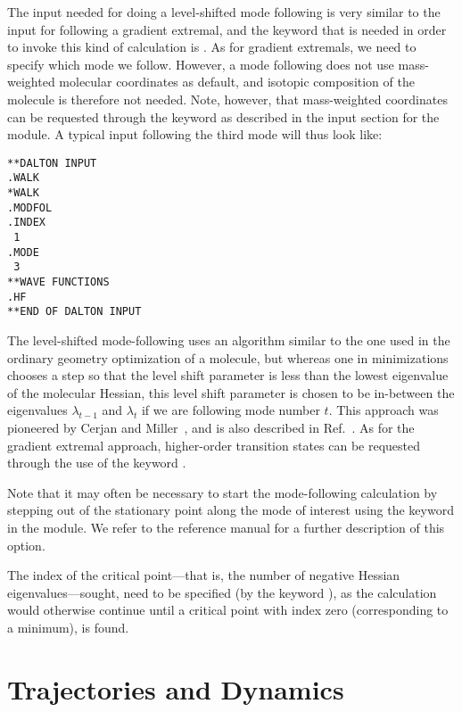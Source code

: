 The input needed for doing a level-shifted mode
following is very similar to the input for
following a gradient extremal, and the
keyword that is needed in order to invoke this kind of calculation is
. As for gradient extremals, we need to specify which
mode we follow. However, a mode following does not use mass-weighted
molecular coordinates as default, and
isotopic composition of the
molecule is therefore not needed. Note, however, that mass-weighted
coordinates can be requested through the keyword  as
described in the input section for the  module. A typical
input following the third mode will thus look like:

\begin{verbatim}
**DALTON INPUT
.WALK
*WALK
.MODFOL
.INDEX
 1
.MODE
 3
**WAVE FUNCTIONS
.HF
**END OF DALTON INPUT
\end{verbatim}

The level-shifted mode-following uses an algorithm similar to the
one used in the ordinary geometry optimization of a molecule, but
whereas one in minimizations chooses a step so that the level
shift parameter is less than the lowest eigenvalue of the
molecular Hessian, this level shift parameter is
chosen to be in-between the eigenvalues $\lambda_{t-1}$ and
$\lambda_{t}$ if we are following mode number $t$. This approach
was pioneered by Cerjan and
Miller~\cite{cjcwhmjcp75}, and is also described in
Ref.~\cite{hjajpjthjcp85}. As for the gradient extremal approach,
higher-order transition states can be
requested through the use of the keyword .

Note that it may often be necessary to start the mode-following
calculation by stepping out of the stationary point along the
mode of interest using the keyword  in the
 module. We refer to the reference manual for a further
description of this option.

The index of the critical point---that is,
the number of negative Hessian
eigenvalues---sought, need to 
be specified (by the keyword ), as the calculation would
otherwise continue until a critical point with index zero
(corresponding to a minimum), is found.

\section{Trajectories and Dynamics}

